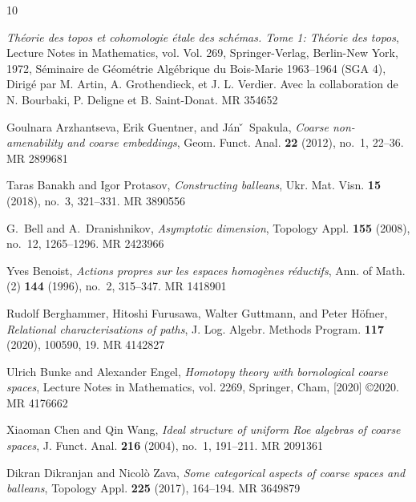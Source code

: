 \documentclass[12pt, a4paper]{amsart}
\theoremstyle{definition}
\begin{document}
\providecommand{\bysame}{\leavevmode\hbox to3em{\hrulefill}\thinspace}
\providecommand{\MR}{\relax\ifhmode\unskip\space\fi MR }
\providecommand{\MRhref}[2]{%
  \href{http://www.ams.org/mathscinet-getitem?mr=#1}{#2}
}
\providecommand{\href}[2]{#2}
\begin{thebibliography}{10}

\emph{Th\'eorie des topos et cohomologie \'etale des sch\'emas. {T}ome 1:
  {T}h\'eorie des topos}, Lecture Notes in Mathematics, vol. Vol. 269,
  Springer-Verlag, Berlin-New York, 1972, S\'eminaire de G\'eom\'etrie
  Alg\'ebrique du Bois-Marie 1963--1964 (SGA 4), Dirig\'e{} par M. Artin, A.
  Grothendieck, et J. L. Verdier. Avec la collaboration de N. Bourbaki, P.
  Deligne et B. Saint-Donat. \MR{354652}

Goulnara Arzhantseva, Erik Guentner, and J\'an \v~Spakula, \emph{Coarse
  non-amenability and coarse embeddings}, Geom. Funct. Anal. \textbf{22}
  (2012), no.~1, 22--36. \MR{2899681}

Taras Banakh and Igor Protasov, \emph{Constructing balleans}, Ukr. Mat. Visn.
  \textbf{15} (2018), no.~3, 321--331. \MR{3890556}

G.~Bell and A.~Dranishnikov, \emph{Asymptotic dimension}, Topology Appl.
  \textbf{155} (2008), no.~12, 1265--1296. \MR{2423966}

Yves Benoist, \emph{Actions propres sur les espaces homog\`enes r\'{e}ductifs},
  Ann. of Math. (2) \textbf{144} (1996), no.~2, 315--347. \MR{1418901}

Rudolf Berghammer, Hitoshi Furusawa, Walter Guttmann, and Peter H\"ofner,
  \emph{Relational characterisations of paths}, J. Log. Algebr. Methods
  Program. \textbf{117} (2020), 100590, 19. \MR{4142827}

Ulrich Bunke and Alexander Engel, \emph{Homotopy theory with bornological
  coarse spaces}, Lecture Notes in Mathematics, vol. 2269, Springer, Cham,
  [2020] \copyright2020. \MR{4176662}

Xiaoman Chen and Qin Wang, \emph{Ideal structure of uniform {R}oe algebras of
  coarse spaces}, J. Funct. Anal. \textbf{216} (2004), no.~1, 191--211.
  \MR{2091361}

Dikran Dikranjan and Nicol\`o Zava, \emph{Some categorical aspects of coarse
  spaces and balleans}, Topology Appl. \textbf{225} (2017), 164--194.
  \MR{3649879}


\end{thebibliography}
\end{document}
